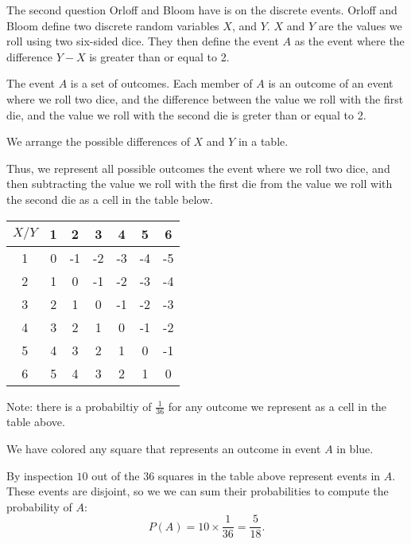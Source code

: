 \documentclass[a4paper,11pt]{article}
\begin{document}
The second question Orloff and Bloom have is on the discrete events.
Orloff and Bloom define two discrete random variables $X$, and $Y$.
$X$ and $Y$ are the values we roll using two six-sided dice.
They then define the event $A$ as the event where the difference
$Y-X$ is greater than or equal to 2.

The event $A$ is a set of outcomes.  Each member of $A$ is
an outcome of an event where we roll two dice, and the difference
between the value we roll with the first die, and the value
we roll with the second die is greter than or equal to 2.

We arrange the possible differences of $X$ and $Y$ in a table.

Thus, we represent all possible outcomes the event where we roll
two dice, and then subtracting the value we roll with the first die
from the value we roll with the second die as a cell in the
table below.

\begin{center}
  \begin{tabular}{ | c | c | c | c | c | c | c |}
    \hline
    $X/Y$ & 1  &  2 &  3 &  4 &  5 &  6   \\ \hline
    1     & 0  & -1 & -2 & -3 & -4 & -5   \\ \hline
    2     & 1  &  0 & -1 & -2 & -3 & -4   \\ \hline
    3     & \cellcolor{blue!25} 2  &  1 &  0 & -1 & -2 & -3   \\ \hline
    4     & \cellcolor{blue!25} 3  &  \cellcolor{blue!25} 2 &  1 &  0 & -1 & -2   \\ \hline
    5     & \cellcolor{blue!25} 4  &  \cellcolor{blue!25} 3 &  \cellcolor{blue!25} 2 &  1 &  0 & -1   \\ \hline
    6     & \cellcolor{blue!25} 5  &  \cellcolor{blue!25} 4 &  \cellcolor{blue!25} 3 &  \cellcolor{blue!25} 2 &  1 &  0   \\ \hline
  \end{tabular}
\end{center}

Note: there is a probabiltiy of $\frac{1}{36}$ for any outcome
we represent as a cell in the table above.

We have colored any square that represents an outcome in event $A$ in blue.

By inspection $10$ out of the $36$ squares in the table above represent
events in $A$.  These events are disjoint, so we we can sum their
probabilities to compute the probability of $A$:
\begin{equation}
P\left(A \right) = 10 \times \frac{1}{36} = \frac{5}{18}.
\end{equation}
\end{document}
